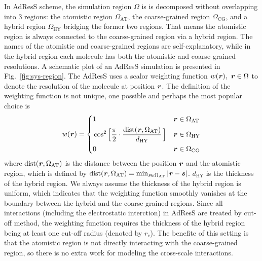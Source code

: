 \documentclass[epjST]{svjour}
\newcommand{\vect}[1]{\textbf{\textit{#1}}}
\newcommand{\dist}[0]{\textrm {dist}}
\newcommand{\AT}[0]{\textrm{AT}}
\newcommand{\HY}[0]{\textrm{HY}}
\newcommand{\CG}[0]{\textrm{CG}}
\begin{document}
In AdResS scheme, the simulation region $\Omega$ is 
is decomposed without overlapping into 3 regions:
the atomistic region $\Omega_\AT$, the coarse-grained region $\Omega_\CG$, and
a hybrid region $\Omega_\HY$ bridging the former two regions.
That means the atomistic region is always connected to the coarse-grained region via a hybrid region.
The names of the atomistic and coarse-grained regions are self-explanatory, while
in the hybrid region each molecule has both the atomistic and coarse-grained resolutions.
A schematic plot of an AdResS simulation is presented in Fig.~\ref{fig:sys-region}.
The AdResS uses a scalor weighting function $w(\vect r),\ \vect r\in\Omega$ 
to denote the resolution of the molecule at position $\vect r$.
The definition of the weighting function
is not unique, one possible and perhaps the most popular choice is
\begin{equation}\label{eqn:old-w}
  w(\vect r) =
  \left\{
    \begin{alignedat}{3}
      &1 &\quad& \vect r \in \Omega_\AT\\
      &\cos^2\Big[\frac{\pi}{2 } \cdot \frac{\dist(\vect r, \Omega_\AT)}{d_\HY}\,\Big] && \vect r \in\Omega_\HY \\
      &0 &    & \vect r \in \Omega_\CG 
    \end{alignedat}
  \right.
\end{equation}
where $\dist(\vect r, \Omega_\AT)$ is the distance between the
position $\vect r$ and the atomistic region, which is defined
by $\dist(\vect r, \Omega_\AT) = \min_{\vect s\in\Omega_\AT} \vert
\vect r - \vect s \vert$.  $d_\HY$ is the thickness of the hybrid
region. We always assume the thickness of the hybrid region is
uniform, which indicates that the weighting function smoothly vanishes
at the boundary between the hybrid and the coarse-grained regions.
Since all interactions (including the electrostatic interction) in AdResS are treated
by cut-off method, the weighting function requires the thickness of
the hybrid region being at least one cut-off radius (denoted by $r_c$). 
The benefite of this setting is that the atomistic
region is not directly interacting with the coarse-grained region,
so there is no extra work for modeling the cross-scale interactions.
\end{document}

